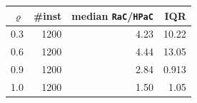 \begin{tabular}{@{}rrrr@{}}
\toprule
$\varrho$ & \#inst & median \texttt{RaC}/\texttt{HPaC} & IQR \\
\midrule
0.3 & 1200 & 4.23 & 10.22 \\
0.6 & 1200 & 4.44 & 13.05 \\
0.9 & 1200 & 2.84 & 0.913 \\
1.0 & 1200 & 1.50 & 1.05 \\
\bottomrule
\end{tabular}
